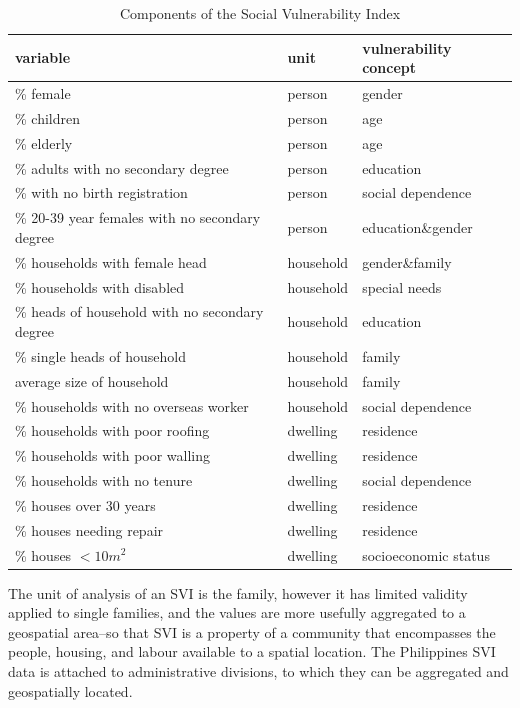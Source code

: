 \documentclass[draft]{article}
\begin{document}
\begin{table}
  \begin{tabular}{l l l}
    \hline
    \bf{variable} & \bf{unit} & \bf{vulnerability concept} \\
    \hline
    \% female & person & gender \\
    \% children & person & age \\
    \% elderly & person & age \\
    \% adults with no secondary degree & person & education \\
    \% with no birth registration & person & social dependence \\
    \% 20-39 year females with no secondary degree & person & education\&gender \\
    \% households with female head & household & gender\&family \\
    \% households with disabled & household & special needs \\
    \% heads of household with no secondary degree & household & education \\
    \% single heads of household & household & family \\
    average size of household & household & family \\
    \% households with no overseas worker & household & social dependence \\
    \% households with poor roofing & dwelling & residence \\
    \% households with poor walling & dwelling & residence \\
    \% households with no tenure & dwelling & social dependence \\
    \% houses over 30 years & dwelling & residence \\
    \% houses needing repair & dwelling & residence \\
    \% houses $< 10m^2$ & dwelling & socioeconomic status \\
    \hline
  \end{tabular}
  \caption{Components of the Social Vulnerability Index} \label{tab:svi}
\end{table}

The unit of analysis of an SVI is the family, however it has limited validity applied to single families, and the values are more usefully aggregated to a geospatial area--so that SVI is a property of a community that encompasses the people, housing, and labour available to a spatial location.  The Philippines SVI data is attached to administrative divisions, to which they can be aggregated and geospatially located.
\end{document}
